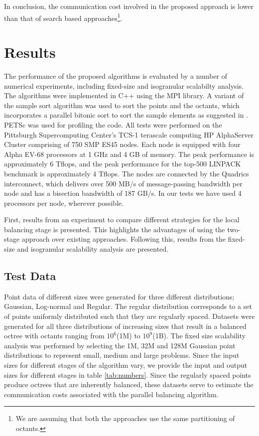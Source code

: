 In conclusion, the communication cost involved in the proposed
approach is lower than that of search based approaches\footnote{We are
assuming that both the approaches use the same partitioning of
octants.}.



\section{Results}
\label{sec:results}
The performance of the proposed algorithms is evaluated by a number of
numerical experiments, including fixed-size and isogranular scalabilty
analysis. The algorithms were implemented in C++ using the MPI
library. A variant of the sample sort algorithm was used to sort the
points and the octants, which incorporates a parallel bitonic sort to
sort the sample elements as suggested in \cite {karypis03}. PETSc
\cite{petsc-web-page} was used for profiling the code. All tests were
performed on the Pittsburgh Supercomputing Center's TCS-1 terascale
computing HP AlphaServer Cluster comprising of 750 SMP ES45 nodes.
Each node is equipped with four Alpha EV-68 processors at 1 GHz and 4
GB of memory. The peak performance is approximately 6 Tflops, and
the peak performance for the top-500 LINPACK benchmark is
approximately 4 Tflops.  The nodes are connected by the Quadrics
interconnect, which delivers over 500 MB/s of message-passing
bandwidth per node and has a bisection bandwidth of 187 GB/s. In our
tests we have used 4 processors per node, wherever possible.

First, results from an experiment to compare different strategies for
the local balancing stage is presented. This highlights the advantages
of using the two-stage approach over existing approaches. Following
this, results from the fixed-size and isogranular scalability analysis
are presented.

\subsection{Test Data} 
\label{sec:data}
Point data of different sizes were generated for three different
distributions; Gaussian, Log-normal and Regular. The regular
distribution corresponds to a set of points uniformly distributed such
that they are regularly spaced. Datasets were generated for all three
distributions of increasing sizes that result in a balanced octree
with octants ranging from $10^6$(1M) to $10^9$(1B). The fixed size
scalability analysis was performed by selecting the 1M, 32M and 128M
Gaussian point distributions to represent small, medium and large
problems.  Since the input sizes for different stages of the algorithm
vary, we provide the input and output sizes for different
stages in table \ref{tab:numbers}. Since the regularly spaced points
produce octrees that are inherently balanced, these datasets serve to
estimate the communication costs associated with the parallel
balancing algorithm.

